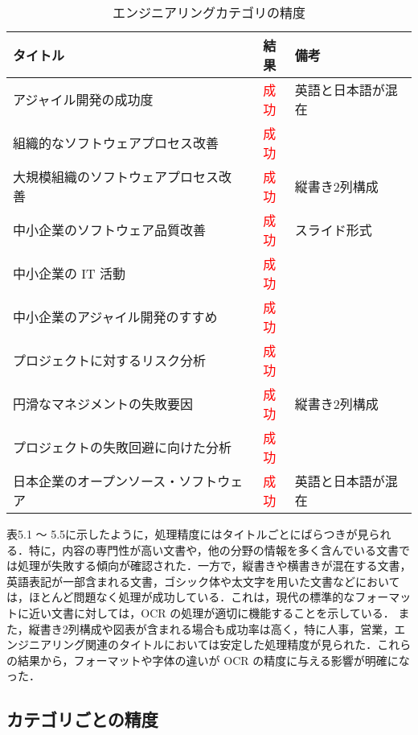 \begin{table}[h]
  \label{tab:doc_engineer}
  \begin{center}
  \begin{tabular}{|l|c|l|}
    \hline
    \textbf{タイトル} & \textbf{結果} & \textbf{備考} \\ \hline
    アジャイル開発の成功度 & \textcolor{red}{成功} & 英語と日本語が混在 \\ \hline
    組織的なソフトウェアプロセス改善 & \textcolor{red}{成功} &  \\ \hline
    大規模組織のソフトウェアプロセス改善 & \textcolor{red}{成功} & 縦書き2列構成 \\ \hline
    中小企業のソフトウェア品質改善 & \textcolor{red}{成功} & スライド形式 \\ \hline
    中小企業の IT 活動 & \textcolor{red}{成功} & \\ \hline
    中小企業のアジャイル開発のすすめ & \textcolor{red}{成功} & \\ \hline
    プロジェクトに対するリスク分析 & \textcolor{red}{成功} & \\ \hline
    円滑なマネジメントの失敗要因 & \textcolor{red}{成功} & 縦書き2列構成 \\ \hline
    プロジェクトの失敗回避に向けた分析 & \textcolor{red}{成功} & \\ \hline
    日本企業のオープンソース・ソフトウェア & \textcolor{red}{成功} & 英語と日本語が混在 \\ \hline
  \end{tabular}
  \end{center}
  \caption{エンジニアリングカテゴリの精度}
\end{table}

表5.1 ～ 5.5に示したように，処理精度にはタイトルごとにばらつきが見られる．特に，内容の専門性が高い文書や，他の分野の情報を多く含んでいる文書では処理が失敗する傾向が確認された．一方で，縦書きや横書きが混在する文書，英語表記が一部含まれる文書，ゴシック体や太文字を用いた文書などにおいては，ほとんど問題なく処理が成功している．これは，現代の標準的なフォーマットに近い文書に対しては，OCR の処理が適切に機能することを示している．
また，縦書き2列構成や図表が含まれる場合も成功率は高く，特に人事，営業，エンジニアリング関連のタイトルにおいては安定した処理精度が見られた．これらの結果から，フォーマットや字体の違いが OCR の精度に与える影響が明確になった．

\subsection{カテゴリごとの精度}
\label{subsec:category}

